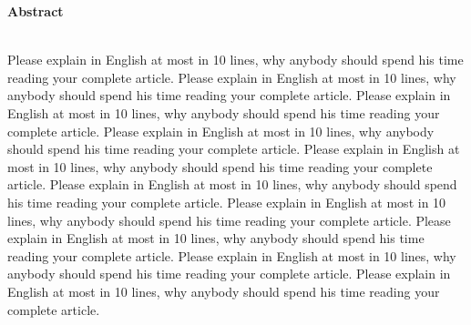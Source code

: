 \documentclass[fleqn,a4paper,10pt]{article}
\newenvironment*{myabstract}{\begin{Large}\bfseries}{\end{Large}\\[6pt]}%
\begin{document}
\begin{myabstract} Abstract \end{myabstract}
Please explain in English at most in 10 lines, why anybody should spend his time reading your complete article. Please explain in English at most in 10 lines, why anybody should spend his time reading your complete article. Please explain in English at most in 10 lines, why anybody should spend his time reading your complete article. Please explain in English at most in 10 lines, why anybody should spend his time reading your complete article. Please explain in English at most in 10 lines, why anybody should spend his time reading your complete article. Please explain in English at most in 10 lines, why anybody should spend his time reading your complete article. Please explain in English at most in 10 lines, why anybody should spend his time reading your complete article. Please explain in English at most in 10 lines, why anybody should spend his time reading your complete article. Please explain in English at most in 10 lines, why anybody should spend his time reading your complete article. Please explain in English at most in 10 lines, why anybody should spend his time reading your complete article.


\vspace{18pt} %
\end{document}
